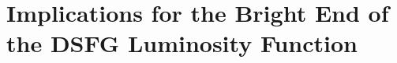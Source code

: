 \documentclass[iop]{emulateapj}
\begin{document}
\section{Implications for the Bright End of the DSFG Luminosity
Function}\label{sec:discuss}




\end{document}
